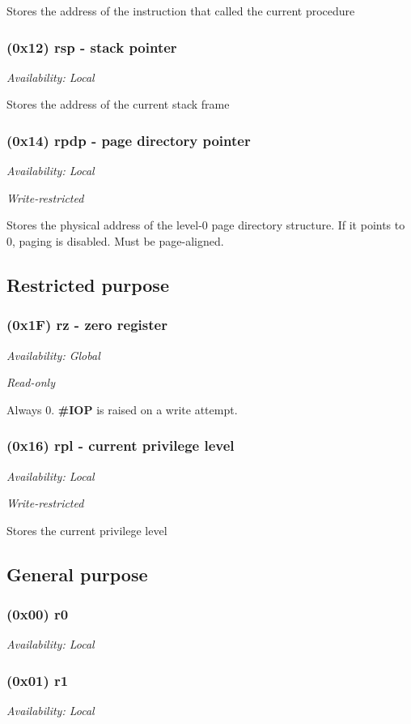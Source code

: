 \documentclass[a4paper,10pt]{article}
\begin{document}
Stores the address of the instruction that called the current procedure

\subsubsection{(0x12) rsp - stack pointer}
{\small \textit{Availability: Local}}

Stores the address of the current stack frame

\subsubsection{(0x14) rpdp - page directory pointer}
{\small \textit{Availability: Local}}

{\small \textit{Write-restricted}}

Stores the physical address of the level-0 page directory structure. If it points to 0, paging is disabled. Must be page-aligned.

\subsection{Restricted purpose}
\subsubsection{(0x1F) rz - zero register}
{\small \textit{Availability: Global}}

{\small \textit{Read-only}}

Always 0. \textbf{\#IOP} is raised on a write attempt.

\subsubsection{(0x16) rpl - current privilege level}
{\small \textit{Availability: Local}}

{\small \textit{Write-restricted}}

Stores the current privilege level

\subsection{General purpose}
\subsubsection{(0x00) r0}
{\small \textit{Availability: Local}}

\subsubsection{(0x01) r1}
{\small \textit{Availability: Local}}
\end{document}
